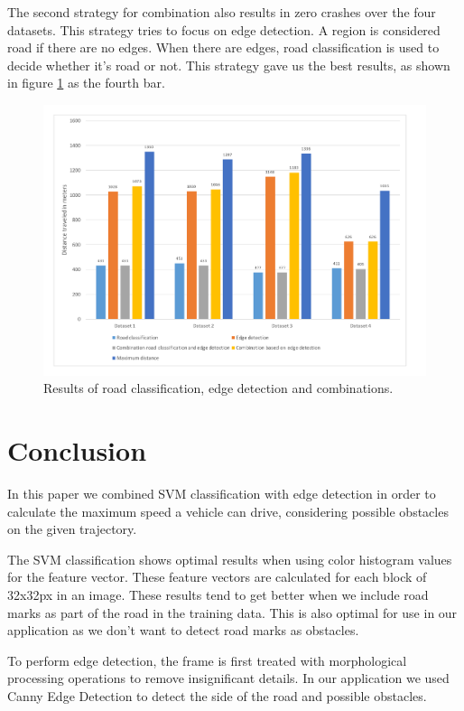 \documentclass[runningheads,a4paper]{llncs}
\begin{document}
The second strategy for combination also results in zero crashes over the four datasets. This strategy tries to focus on edge detection. A region is considered road if there are no edges. When there are edges, road classification is used to decide whether it's road or not. This strategy gave us the best results, as shown in figure \ref{distance_result} as the fourth bar.
\begin{figure}[ht]
	\centering
	\includegraphics[width=\textwidth]{fig/distance_result}
	\caption{Results of road classification, edge detection and combinations.\label{distance_result}}
\end{figure}

\section{Conclusion}
In this paper we combined SVM classification with edge detection in order to calculate the maximum speed a vehicle can drive, considering possible obstacles on the given trajectory.

The SVM classification shows optimal results when using color histogram values for the feature vector. These feature vectors are calculated for each block of 32x32px in an image.
These results tend to get better when we include road marks as part of the road in the training data. This is also optimal for use in our application as we don't want to detect road marks as obstacles.

To perform edge detection, the frame is first treated with morphological processing operations to remove insignificant details. In our application we used Canny Edge Detection to detect the side of the road and possible obstacles.
\end{document}
